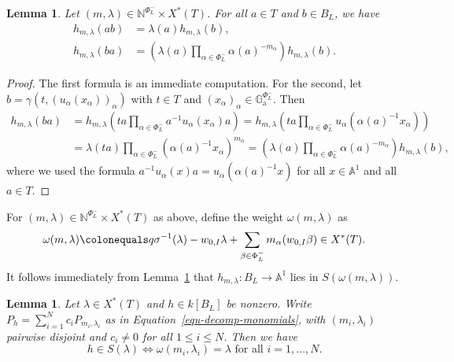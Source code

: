 \documentclass[11pt]{amsart}
\numberwithin{equation}{section}
\newtheorem{lemma}[theorem]{Lemma}
\theoremstyle{definition}
\theoremstyle{remark}
\renewcommand{\AA}{\mathbb{A}}
\newcommand{\GG}{\mathbb{G}}
\newcommand{\NN}{\mathbb{N}}
\begin{document}
\begin{lemma}\label{lemma-formula-hmlambda}
Let $(m,\lambda)\in \NN^{\Phi^{-}_{L}}\times X^*(T)$. For all $a\in T$ and $b\in B_L$, we have
\begin{align}
h_{m,\lambda}(ab)&=\lambda(a)h_{m,\lambda}(b), \\
h_{m,\lambda}(ba)&=\left(\lambda(a) \prod_{\alpha\in \Phi^{-}_{L}}\alpha(a)^{-m_{\alpha}}\right) h_{m,\lambda}(b).
\end{align}
\end{lemma}
\begin{proof}
The first formula is an immediate computation. For the second, let $b=\gamma(t,(u_\alpha(x_\alpha))_\alpha)$ with $t\in T$ and $(x_\alpha)_\alpha\in \GG_{\mathrm{a}}^{\Phi^{-}_{L}}$. Then 
\begin{align}
h_{m,\lambda}(ba)&=h_{m,\lambda}\left(ta\prod_{\alpha\in \Phi^{-}_{L}} a^{-1}u_\alpha(x_\alpha) a \right)= h_{m,\lambda}\left(ta\prod_{\alpha\in \Phi^{-}_{L}} u_\alpha(\alpha(a)^{-1} x_\alpha)\right) \\
&= \lambda(ta) \prod_{\alpha\in \Phi^{-}_{L}} (\alpha(a)^{-1} x_\alpha)^{m_\alpha} =\left(\lambda(a) \prod_{\alpha\in \Phi^{-}_{L}}\alpha(a)^{-m_{\alpha}}\right) h_{m,\lambda}(b),
\end{align}
where we used the formula $a^{-1} u_\alpha(x) a = u_\alpha(\alpha(a)^{-1}x)$ for all $x\in \AA^1$ and all $a\in T$.
\end{proof}

For $(m,\lambda)\in \NN^{\Phi^{-}_{L}}\times X^*(T)$ as above, define the weight $\omega(m,\lambda)$ as
\begin{equation}\label{omega-weight}
\omega(m,\lambda)\colonequals q \sigma^{-1}(\lambda)- w_{0,I}\lambda +\sum_{\beta \in \Phi^{-}_{L}} m_\alpha (w_{0,I}\beta) \in X^*(T).
\end{equation}
It follows immediately from Lemma~\ref{lemma-formula-hmlambda} that $h_{m,\lambda}\colon B_L\to \AA^1$ lies in $S(\omega(m,\lambda))$.

\begin{lemma}\label{lemma-same-weight}
Let $\lambda\in X^*(T)$ and $h\in k[B_L]$ be nonzero. Write $P_h=\sum_{i=1}^N c_i P_{m_i,\lambda_i}$ as in Equation~\eqref{equ-decomp-monomials}, with $(m_i,\lambda_i)$ pairwise disjoint and $c_i\neq 0$ for all $1\leq i \leq N$. Then we have
\begin{equation}
h\in S(\lambda) \Longleftrightarrow \omega(m_i,\lambda_i)=\lambda \textrm{ for all } i=1, \dots, N.
\end{equation}
\end{lemma}
\end{document}
